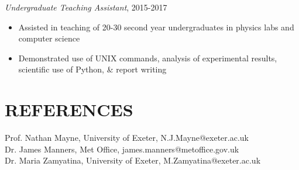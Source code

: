 \documentclass[letter, margin, 10pt]{res} %
\begin{document}
\begin{resume}
{\sl Undergraduate Teaching Assistant}, 2015-2017
\begin{itemize}[noitemsep,topsep=0pt,parsep=0pt,partopsep=0pt]
\item Assisted in teaching of 20-30 second year undergraduates in physics labs and computer science 
\item Demonstrated use of UNIX commands, analysis of experimental results, scientific use of Python, \& report writing
\end{itemize}

 

 \section{REFERENCES} 

Prof. Nathan Mayne, University of Exeter, N.J.Mayne@exeter.ac.uk \\
Dr. James Manners, Met Office, james.manners@metoffice.gov.uk \\
Dr. Maria Zamyatina, University of Exeter, M.Zamyatina@exeter.ac.uk \\
 

\end{resume}
\end{document}
